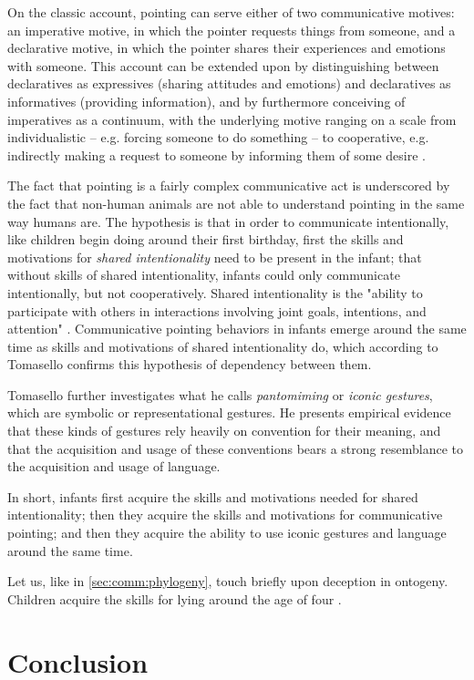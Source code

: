 On the classic account, pointing can serve either of two communicative motives: an imperative motive, in which the pointer requests things from someone, and a declarative motive, in which the pointer shares their experiences and emotions with someone.
This account can be extended upon by distinguishing between declaratives as expressives (sharing attitudes and emotions) and declaratives as informatives (providing information), and by furthermore conceiving of imperatives as a continuum, with the underlying motive ranging on a scale from individualistic -- e.g. forcing someone to do something -- to cooperative, e.g. indirectly making a request to someone by informing them of some desire \citep{Tomasello08}.

The fact that pointing is a fairly complex communicative act is underscored by the fact that non-human animals are not able to understand pointing in the same way humans are. 
The hypothesis is that in order to communicate intentionally,
like children begin doing around their first birthday, first the skills and motivations for \emph{shared intentionality} need to be present in the infant; that without skills of shared intentionality, infants could only communicate intentionally, but not cooperatively.
Shared intentionality is the "ability to participate with others in interactions involving joint goals, intentions, and attention" \citep[p.~139]{Tomasello08}. Communicative pointing behaviors in infants emerge around the same time as skills and motivations of shared intentionality do, which according to Tomasello confirms this hypothesis of dependency between them.

Tomasello further investigates what he calls \emph{pantomiming} or \emph{iconic gestures}, which are symbolic or representational gestures. 
He presents empirical evidence that these kinds of gestures rely heavily on convention for their meaning, and that the acquisition and usage of these conventions bears a strong resemblance to the acquisition and usage of language.

In short, infants first acquire the skills and motivations needed for shared intentionality; then they acquire the skills and motivations for communicative pointing; and then they acquire the ability to use iconic gestures and language around the same time.

Let us, like in \cref{sec:comm:phylogeny}, touch briefly upon deception in ontogeny. Children acquire the skills for lying around the age of four \citep{Lee13}.



\section{Conclusion}
